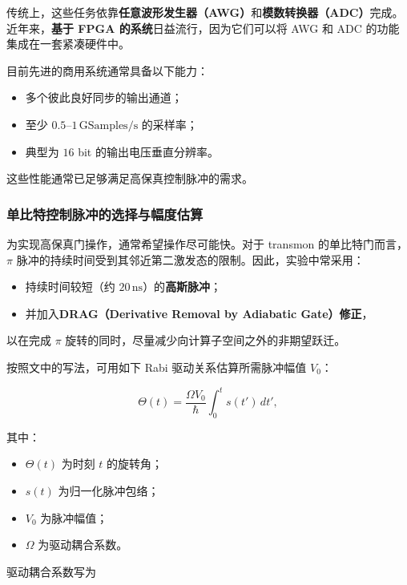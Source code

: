 \documentclass[12pt,a4paper,oneside]{ctexbook}
\begin{document}
传统上，这些任务依靠\textbf{任意波形发生器（AWG）}和\textbf{模数转换器（ADC）}完成。近年来，\textbf{基于 FPGA 的系统}日益流行，因为它们可以将 AWG 和 ADC 的功能集成在一套紧凑硬件中。

目前先进的商用系统通常具备以下能力：

\begin{itemize}
    \item 多个彼此良好同步的输出通道；
    \item 至少 $0.5$--$1\,\mathrm{GSamples/s}$ 的采样率；
    \item 典型为 $16$ bit 的输出电压垂直分辨率。
\end{itemize}

这些性能通常已足够满足高保真控制脉冲的需求。

\subsubsection{单比特控制脉冲的选择与幅度估算}

为实现高保真门操作，通常希望操作尽可能快。对于 transmon 的单比特门而言，$\pi$ 脉冲的持续时间受到其邻近第二激发态的限制。因此，实验中常采用：

\begin{itemize}
    \item 持续时间较短（约 $20\,\mathrm{ns}$）的\textbf{高斯脉冲}；
    \item 并加入\textbf{DRAG（Derivative Removal by Adiabatic Gate）修正}，
\end{itemize}

以在完成 $\pi$ 旋转的同时，尽量减少向计算子空间之外的非期望跃迁。

按照文中的写法，可用如下 Rabi 驱动关系估算所需脉冲幅值 $V_0$：

\begin{equation}
    \Theta(t)
    =
    \frac{\Omega V_0}{\hbar}
    \int_0^t s(t')\,dt',
    \tag{49}
\end{equation}

其中：

\begin{itemize}
    \item $\Theta(t)$ 为时刻 $t$ 的旋转角；
    \item $s(t)$ 为归一化脉冲包络；
    \item $V_0$ 为脉冲幅值；
    \item $\Omega$ 为驱动耦合系数。
\end{itemize}

驱动耦合系数写为
\end{document}
